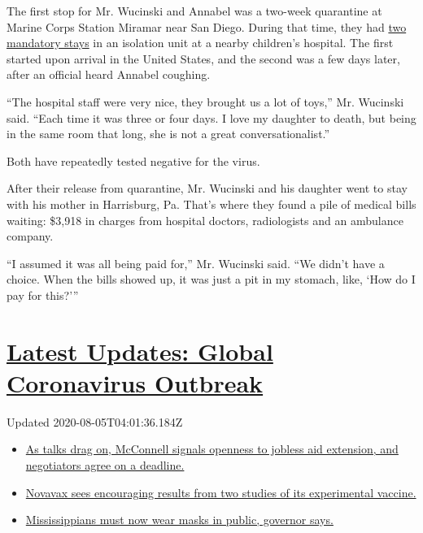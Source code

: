 The first stop for Mr. Wucinski and Annabel was a two-week quarantine at
Marine Corps Station Miramar near San Diego. During that time, they had
\href{https://www.cbs8.com/article/news/health/coronavirus/girl-back-in-hospital-mcas-miramar-radys/509-c2a9e22e-0323-4152-be3b-3cf7720ebc3a}{two
mandatory stays} in an isolation unit at a nearby children's hospital.
The first started upon arrival in the United States, and the second was
a few days later, after an official heard Annabel coughing.

``The hospital staff were very nice, they brought us a lot of toys,''
Mr. Wucinski said. ``Each time it was three or four days. I love my
daughter to death, but being in the same room that long, she is not a
great conversationalist.''

Both have repeatedly tested negative for the virus.

After their release from quarantine, Mr. Wucinski and his daughter went
to stay with his mother in Harrisburg, Pa. That's where they found a
pile of medical bills waiting: \$3,918 in charges from hospital doctors,
radiologists and an ambulance company.

``I assumed it was all being paid for,'' Mr. Wucinski said. ``We didn't
have a choice. When the bills showed up, it was just a pit in my
stomach, like, `How do I pay for this?'''

\hypertarget{latest-updates-global-coronavirus-outbreak}{%
\section{\texorpdfstring{\href{https://www.nytimes.com/2020/08/04/world/coronavirus-cases.html?action=click\&pgtype=Article\&state=default\&region=MAIN_CONTENT_1\&context=storylines_live_updates}{Latest
Updates: Global Coronavirus
Outbreak}}{Latest Updates: Global Coronavirus Outbreak}}\label{latest-updates-global-coronavirus-outbreak}}

Updated 2020-08-05T04:01:36.184Z

\begin{itemize}
\tightlist
\item
  \href{https://www.nytimes.com/2020/08/04/world/coronavirus-cases.html?action=click\&pgtype=Article\&state=default\&region=MAIN_CONTENT_1\&context=storylines_live_updates\#link-762df92}{As
  talks drag on, McConnell signals openness to jobless aid extension,
  and negotiators agree on a deadline.}
\item
  \href{https://www.nytimes.com/2020/08/04/world/coronavirus-cases.html?action=click\&pgtype=Article\&state=default\&region=MAIN_CONTENT_1\&context=storylines_live_updates\#link-1228a480}{Novavax
  sees encouraging results from two studies of its experimental
  vaccine.}
\item
  \href{https://www.nytimes.com/2020/08/04/world/coronavirus-cases.html?action=click\&pgtype=Article\&state=default\&region=MAIN_CONTENT_1\&context=storylines_live_updates\#link-794484ed}{Mississippians
  must now wear masks in public, governor says.}
\end{itemize}

